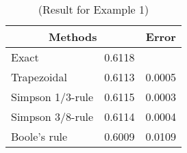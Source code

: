 \documentclass[12pt]{report}
\begin{document}
	\begin{table}[!thb]
		\begin{center}
			\begin{tabular}{|l|c|c|}
				\hline
				\multicolumn{2}{|c|}{Methods}& Error\\ \hline
				Exact & 0.6118& \\ \hline
				Trapezoidal & 0.6113 & 0.0005 \\ \hline
				Simpson 1/3-rule & 0.6115 & 0.0003 \\ \hline
				Simpson 3/8-rule & 0.6114 & 0.0004 \\ \hline
				Boole's rule & 0.6009 & 0.0109\\ \hline
			\end{tabular}
		\end{center}
		\caption{(Result for Example 1)}
		\label{tb:4_1}
	\end{table}
\end{document}
